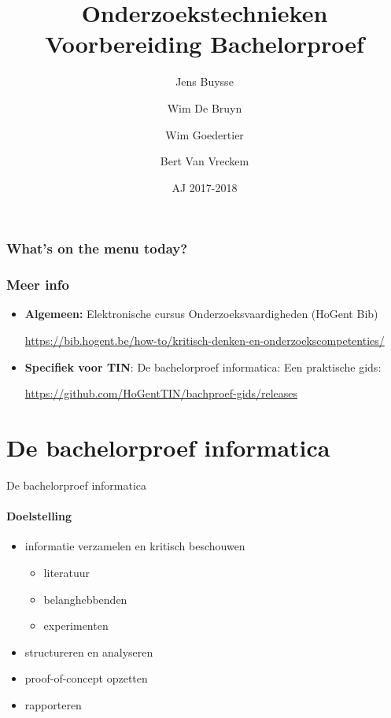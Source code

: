 \documentclass[usenames,dvipsnames]{beamer}
\title[Intro]{Onderzoekstechnieken\\Voorbereiding Bachelorproef}
\author{Jens Buysse \and Wim {De Bruyn} \and Wim Goedertier \and Bert {Van Vreckem}}
\date{AJ 2017-2018}
\begin{document}

\HoGentLogo

\titleframe


\begin{frame}
  \frametitle{What's on the menu today?}

  \tableofcontents
\end{frame}

\begin{frame}
  \frametitle{Meer info}
  
  \begin{itemize}
    \item \textbf{Algemeen:} Elektronische cursus Onderzoeksvaardigheden (HoGent Bib)
    
    \url{https://bib.hogent.be/how-to/kritisch-denken-en-onderzoekscompetenties/}
    
    \item \textbf{Specifiek voor TIN}: De bachelorproef informatica: Een praktische gids:
    
    \url{https://github.com/HoGentTIN/bachproef-gids/releases}
  \end{itemize}
\end{frame}

\section{De bachelorproef informatica}
\sectionframe{}

\begin{frame}{De bachelorproef informatica}
  \framesubtitle{Doelstelling}
  
  
  \begin{itemize}
    \item informatie verzamelen en kritisch beschouwen
    \begin{itemize}
      \item literatuur
      \item belanghebbenden
      \item experimenten
    \end{itemize}
    \item structureren en analyseren
    \item proof-of-concept opzetten
    \item rapporteren
  \end{itemize}

\end{frame}
\end{document}
